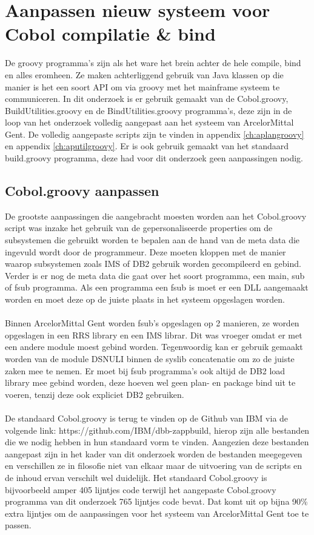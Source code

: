 \section{Aanpassen nieuw systeem voor Cobol compilatie \& bind}
De groovy programma's zijn als het ware het brein achter de hele compile, bind en alles eromheen. Ze maken achterliggend gebruik van Java klassen op die manier is het een soort API om via groovy met het mainframe systeem te communiceren. In dit onderzoek is er gebruik gemaakt van de Cobol.groovy, BuildUtilities.groovy en de BindUtilities.groovy programma's, deze zijn in de loop van het onderzoek volledig aangepast aan het systeem van ArcelorMittal Gent. De volledig aangepaste scripts zijn te vinden in appendix \ref{ch:aplangroovy} en appendix \ref{ch:aputilgroovy}. Er is ook gebruik gemaakt van het standaard build.groovy programma, deze had voor dit onderzoek geen aanpassingen nodig. 

\subsection{Cobol.groovy aanpassen}
\label{subsec:cobol.groovy aanpassen}
De grootste aanpassingen die aangebracht moesten worden aan het Cobol.groovy script was inzake het gebruik van de gepersonaliseerde properties om de subsystemen die gebruikt worden te bepalen aan de hand van de meta data die ingevuld wordt door de programmeur. Deze moeten kloppen met de manier waarop subsystemen zoals IMS of DB2 gebruik worden gecompileerd en gebind. Verder is er nog de meta data die gaat over het soort programma, een main, sub of fsub programma. Als een programma een fsub is moet er een DLL aangemaakt worden en moet deze op de juiste plaats in het systeem opgeslagen worden.
\\ \\
Binnen ArcelorMittal Gent worden fsub's opgeslagen op 2 manieren, ze worden opgeslagen in een RRS library en een IMS librar. Dit was vroeger omdat er met een andere module moest gebind worden. Tegenwoordig kan er gebruik gemaakt worden van de module DSNULI binnen de syslib concatenatie om zo de juiste zaken mee te nemen. Er moet bij fsub programma's ook altijd de DB2 load library mee gebind worden, deze hoeven wel geen plan- en package bind uit te voeren, tenzij deze ook expliciet DB2 gebruiken. 
\\ \\
De standaard Cobol.groovy is terug te vinden op de Github van IBM via de volgende link: https://github.com/IBM/dbb-zappbuild, hierop zijn alle bestanden die we nodig hebben in hun standaard vorm te vinden. Aangezien deze bestanden aangepast zijn in het kader van dit onderzoek worden de bestanden meegegeven en verschillen ze in filosofie niet van elkaar maar de uitvoering van de scripts en de inhoud ervan verschilt wel duidelijk. 
Het standaard Cobol.groovy is bijvoorbeeld amper 405 lijntjes code terwijl het aangepaste Cobol.groovy programma van dit onderzoek 765 lijntjes code bevat. Dat komt uit op bijna 90\% extra lijntjes om de aanpassingen voor het systeem van ArcelorMittal Gent toe te passen.

